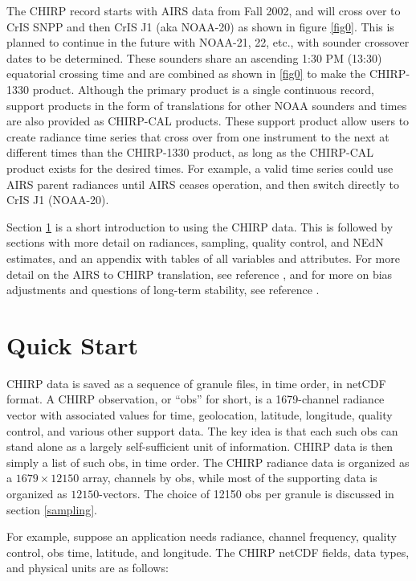\documentclass[11pt]{article}
\begin{document}
The CHIRP record starts with AIRS data from Fall 2002, and will cross over
to CrIS SNPP and then CrIS J1 (aka NOAA-20) as shown in figure \ref{fig0}.
This is planned to continue in the future with NOAA-21, 22, etc., with
sounder crossover dates to be determined.  These sounders share an
ascending 1:30 PM (13:30) equatorial crossing time and are combined as
shown in \ref{fig0} to make the CHIRP-1330 product.  Although the primary
product is a single continuous record, support products in the form of
translations for other NOAA sounders and times are also provided as
CHIRP-CAL products.  These support product allow users to create radiance
time series that cross over from one instrument to the next at different
times than the CHIRP-1330 product, as long as the CHIRP-CAL product exists
for the desired times.  For example, a valid time series could use AIRS
parent radiances until AIRS ceases operation, and then switch directly to
CrIS J1 (NOAA-20).

Section \ref{format} is a short introduction to using the CHIRP data.
This is followed by sections with more detail on radiances, sampling,
quality control, and NEdN estimates, and an appendix with tables of
all variables and attributes.  For more detail on the AIRS to CHIRP
translation, see reference \cite{mott2018}, and for more on bias
adjustments and questions of long-term stability, see reference
\cite{strow2021a}.

\section{Quick Start}
\label{format}

CHIRP data is saved as a sequence of granule files, in time order,
in netCDF format.  A CHIRP observation, or ``obs'' for short, is a
1679-channel radiance vector with associated values for time,
geolocation, latitude, longitude, quality control, and various other
support data.  The key idea is that each such obs can stand alone as
a largely self-sufficient unit of information.  CHIRP data is then
simply a list of such obs, in time order.  The CHIRP radiance data
is organized as a $1679 \times 12150$ array, channels by obs, while
most of the supporting data is organized as $12150$-vectors.  The
choice of 12150 obs per granule is discussed in section
\ref{sampling}.

For example, suppose an application needs radiance, channel
frequency, quality control, obs time, latitude, and longitude.
The CHIRP netCDF fields, data types, and physical units are as
follows:
\end{document}
